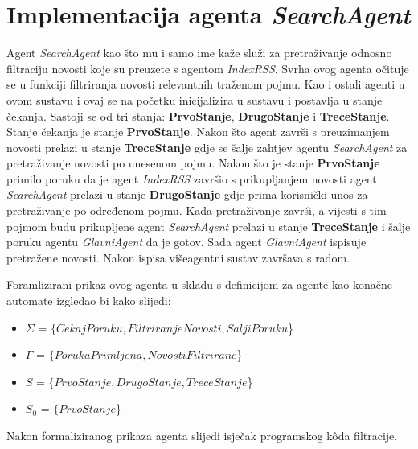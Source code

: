 \documentclass[]{foi} %
\begin{document}
\section{Implementacija agenta \textit{SearchAgent}}
Agent \textit{SearchAgent} kao što mu i samo ime kaže služi za pretraživanje odnosno filtraciju novosti koje su preuzete s agentom \textit{IndexRSS}. Svrha ovog agenta očituje se u funkciji filtriranja novosti relevantnih traženom pojmu. Kao i ostali agenti u ovom sustavu i ovaj se na početku inicijalizira u sustavu i postavlja u stanje čekanja. Sastoji se od tri stanja: \textbf{PrvoStanje}, \textbf{DrugoStanje} i \textbf{TreceStanje}. Stanje čekanja je stanje \textbf{PrvoStanje}. Nakon što agent završi s preuzimanjem novosti prelazi u stanje \textbf{TreceStanje} gdje se šalje zahtjev agentu \textit{SearchAgent} za pretraživanje novosti po unesenom pojmu. Nakon što je stanje \textbf{PrvoStanje} primilo poruku da je agent \textit{IndexRSS} završio s prikupljanjem novosti agent \textit{SearchAgent} prelazi u stanje \textbf{DrugoStanje} gdje prima korisnički unos za pretraživanje po određenom pojmu. Kada pretraživanje završi, a vijesti s tim pojmom budu prikupljene agent \textit{SearchAgent} prelazi u stanje \textbf{TreceStanje} i šalje poruku agentu \textit{GlavniAgent} da je gotov. Sada agent \textit{GlavniAgent} ispisuje pretražene novosti. Nakon ispisa višeagentni sustav završava s radom. 

Foramlizirani prikaz ovog agenta u skladu s definicijom za agente kao konačne automate izgledao bi kako slijedi:

\begin{itemize}
  \item \(\Sigma\) = $\{CekajPoruku, FiltriranjeNovosti, SaljiPoruku$\}
  \item \(\Gamma\) = $\{PorukaPrimljena, NovostiFiltrirane$\}
  \item \(S\) = $\{PrvoStanje, DrugoStanje, TreceStanje$\}
  \item \(S_0\) = $\{PrvoStanje$\}
\end{itemize}

Nakon formaliziranog prikaza  agenta slijedi isječak programskog kôda filtracije.
\end{document}
